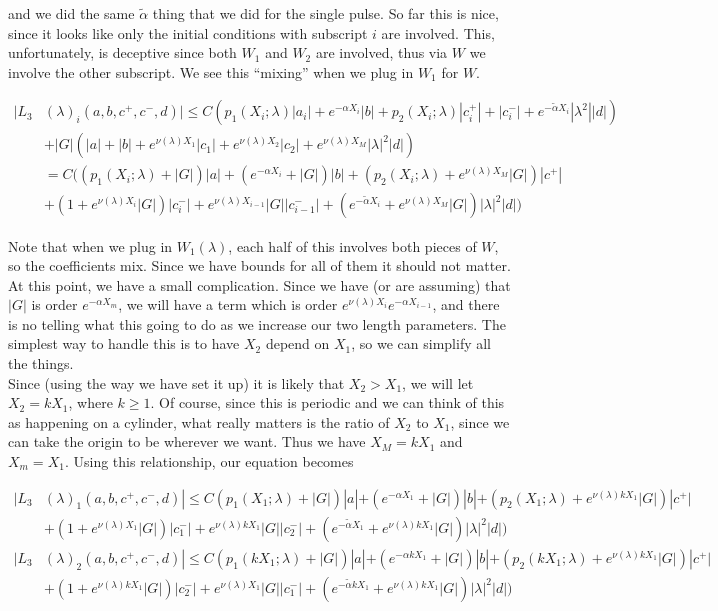 \documentclass[12pt]{article}
\begin{document}
\begin{enumerate}
and we did the same $\tilde{\alpha}$ thing that we did for the single pulse. So far this is nice, since it looks like only the initial conditions with subscript $i$ are involved. This, unfortunately, is deceptive since both $W_1$ and $W_2$ are involved, thus via $W$ we involve the other subscript. We see this ``mixing'' when we plug in $W_1$ for $W$.

\begin{align*}
|L_3&(\lambda)_i(a, b, c^+, c^-, d)| \leq C ( p_1(X_i; \lambda)|a_i|
+ e^{-\alpha X_i}|b| + p_2(X_i; \lambda)|c_i^+| + |c_i^-| + e^{-\tilde{\alpha} X_i} |\lambda^2| |d| ) \\
&+ |G| (|a| + |b| + e^{\nu(\lambda)X_1}|c_1| + e^{\nu(\lambda)X_2}|c_2| + e^{\nu(\lambda)X_M}|\lambda|^2 |d| ) \\
&= C( (p_1(X_i; \lambda) + |G|)|a| + (e^{-\alpha X_i} + |G|) |b| + ( p_2(X_i; \lambda) + e^{\nu(\lambda)X_M} |G|) |c^+| \\
&+ (1 + e^{\nu(\lambda)X_i} |G|)|c_i^-| + e^{\nu(\lambda)X_{i-1}} |G||c_{i-1}^-| + (e^{-\tilde{\alpha} X_i} + e^{\nu(\lambda)X_M} |G|) |\lambda|^2 |d| )
\end{align*}

Note that when we plug in $W_1(\lambda)$, each half of this involves both pieces of $W$, so the coefficients mix. Since we have bounds for all of them it should not matter.\\ 

At this point, we have a small complication. Since we have (or are assuming) that $|G|$ is order $e^{-\alpha X_m}$, we will have a term which is order $e^{\nu(\lambda)X_i} e^{-\alpha X_{i-1}}$, and there is no telling what this going to do as we increase our two length parameters. The simplest way to handle this is to have $X_2$ depend on $X_1$, so we can simplify all the things.\\

Since (using the way we have set it up) it is likely that $X_2 > X_1$, we will let $X_2 = k X_1$, where $k \geq 1$. Of course, since this is periodic and we can think of this as happening on a cylinder, what really matters is the ratio of $X_2$ to $X_1$, since we can take the origin to be wherever we want. Thus we have $X_M = k X_1$ and $X_m = X_1$. Using this relationship, our equation becomes

\begin{align*}
|L_3&(\lambda)_1(a, b, c^+, c^-, d)| \leq C (p_1(X_1; \lambda) + |G|)|a| + (e^{-\alpha X_1} + |G|) |b| + ( p_2(X_1; \lambda) + e^{\nu(\lambda) k X_1 } |G|) |c^+| \\
&+ (1 + e^{\nu(\lambda)X_1} |G|)|c_1^-| + e^{\nu(\lambda)k X_1} |G||c_2^-| + (e^{-\tilde{\alpha} X_1} + e^{\nu(\lambda)k X_1} |G|) |\lambda|^2 |d| ) \\
|L_3&(\lambda)_2(a, b, c^+, c^-, d)| \leq C (p_1(k X_1; \lambda) + |G|)|a| + (e^{-\alpha k X_1} + |G|) |b| + ( p_2(k X_1; \lambda) + e^{\nu(\lambda) k X_1 } |G|) |c^+| \\
&+ (1 + e^{\nu(\lambda)k X_1} |G|)|c_2^-| + e^{\nu(\lambda)X_1} |G||c_1^-| + (e^{-\tilde{\alpha} k X_1} + e^{\nu(\lambda)k X_1} |G|) |\lambda|^2 |d| )
\end{align*}


\end{enumerate}
\end{document}
